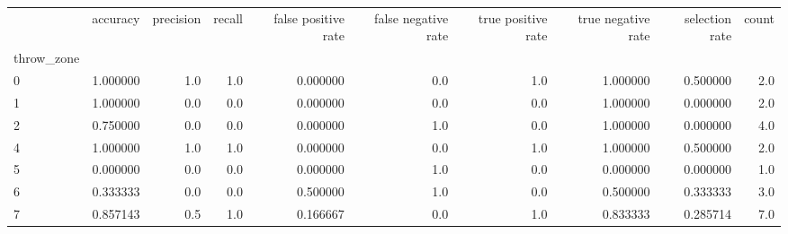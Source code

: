 \begin{tabular}{lrrrrrrrrr}
\toprule
{} &  accuracy &  precision &  recall &  false positive rate &  false negative rate &  true positive rate &  true negative rate &  selection rate &  count \\
throw\_zone &           &            &         &                      &                      &                     &                     &                 &        \\
\midrule
0          &  1.000000 &        1.0 &     1.0 &             0.000000 &                  0.0 &                 1.0 &            1.000000 &        0.500000 &    2.0 \\
1          &  1.000000 &        0.0 &     0.0 &             0.000000 &                  0.0 &                 0.0 &            1.000000 &        0.000000 &    2.0 \\
2          &  0.750000 &        0.0 &     0.0 &             0.000000 &                  1.0 &                 0.0 &            1.000000 &        0.000000 &    4.0 \\
4          &  1.000000 &        1.0 &     1.0 &             0.000000 &                  0.0 &                 1.0 &            1.000000 &        0.500000 &    2.0 \\
5          &  0.000000 &        0.0 &     0.0 &             0.000000 &                  1.0 &                 0.0 &            0.000000 &        0.000000 &    1.0 \\
6          &  0.333333 &        0.0 &     0.0 &             0.500000 &                  1.0 &                 0.0 &            0.500000 &        0.333333 &    3.0 \\
7          &  0.857143 &        0.5 &     1.0 &             0.166667 &                  0.0 &                 1.0 &            0.833333 &        0.285714 &    7.0 \\
\bottomrule
\end{tabular}
